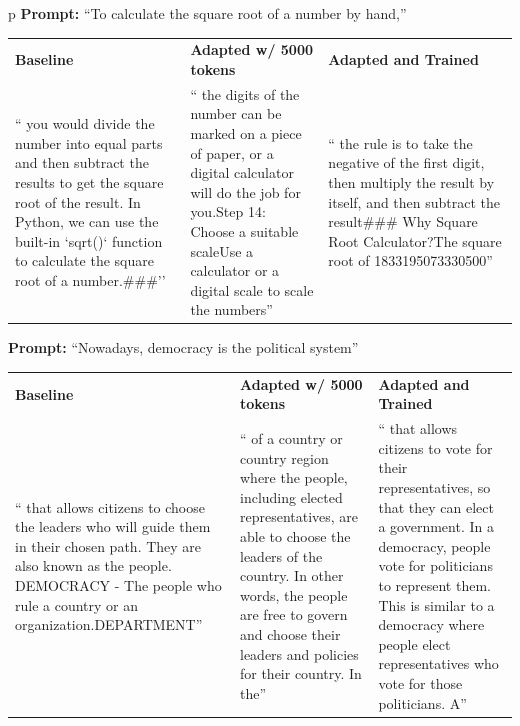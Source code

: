 {
    \newcommand{\prompt}[1]{\textcolor{promptcolor}{#1}}
    \newcommand{\generation}[1]{%
      {\RaggedRight\arraybackslash\color{generationcolor}\sloppy\footnotesize #1\hspace{0pt}\par}%
    }
    \begin{table}[h]
        \centering
        \begin{tabular}{p{\linewidth}}
            \toprule
            \textbf{Prompt:} \prompt{``To calculate the square root of a number by hand,''} \\
            \begin{tabularx}{\hsize}{X|X|X}
                \midrule
                \textbf{Baseline} & \textbf{Adapted w/ 5000 tokens} & \textbf{Adapted and Trained} \\
                \generation{`` you would divide the number into equal parts and then subtract the results to get the square root of the result. In Python, we can use the built-in `sqrt()` function to calculate the square root of a number.\newline \#\#\#''} & \generation{`` the digits of the number can be marked on a piece of paper, or a digital calculator will do the job for you.\newline Step 14: Choose a suitable scale\newline Use a calculator or a digital scale to scale the numbers''} & \generation{`` the rule is to take the negative of the first digit, then multiply the result by itself, and then subtract the result\newline \#\#\# Why Square Root Calculator?\newline The square root of 1833195073330500''} \\
                \midrule
            \end{tabularx}
            \textbf{Prompt:} \prompt{``Nowadays, democracy is the political system''} \\
            \begin{tabularx}{\hsize}{X|X|X}
                \midrule
                \textbf{Baseline} & \textbf{Adapted w/ 5000 tokens} & \textbf{Adapted and Trained} \\
                \generation{`` that allows citizens to choose the leaders who will guide them in their chosen path. They are also known as the people. DEMOCRACY - The people who rule a country or an organization.DEPARTMENT''} & \generation{`` of a country or country region where the people, including elected representatives, are able to choose the leaders of the country. In other words, the people are free to govern and choose their leaders and policies for their country. In the''} & \generation{`` that allows citizens to vote for their representatives, so that they can elect a government. In a democracy, people vote for politicians to represent them. This is similar to a democracy where people elect representatives who vote for those politicians. A''} \\

\end{tabularx}
\end{tabular}
\end{table}}
